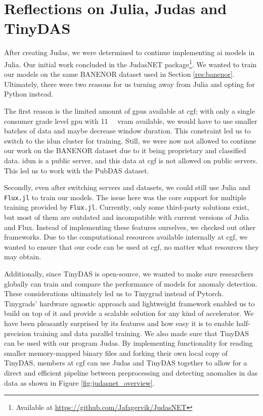 \section*{Reflections on Julia, Judas and TinyDAS}
\label{sec:juliaref}
After creating Judas, we were determined to continue implementing \acrshort{ai} models in Julia. Our initial work concluded in the JudasNET package\footnote{Available at \url{https://github.com/Jafagervik/JudasNET}}. We wanted to train our models on the same BANENOR dataset used in Section \ref{res:banenor}. Ultimately, there were two reasons for us turning away from Julia and opting for Python instead. 

The first reason is the limited amount of \acrshort{gpu}s available at \acrshort{cgf}; with only a single consumer grade level \acrshort{gpu} with \qty{11}{\si{\giga\byte}} \acrshort{vram} available, we would have to use smaller batches of data and maybe decrease window duration. This constraint led us to switch to the \gls{idun} cluster for training. Still, we were now not allowed to continue our work on the BANENOR dataset due to it being proprietary and classified data. \gls{idun} is a public server, and this data at \acrshort{cgf} is not allowed on public servers. This led us to work with the PubDAS \cite{spica2022pubdas, spica2023pubdas} dataset. 

Secondly, even after switching servers and datasets, we could still use Julia and \texttt{Flux.jl} to train our models. The issue here was the core support for multiple training provided by \texttt{Flux.jl}. Currently, only some third-party solutions exist, but most of them are outdated and incompatible with current versions of Julia and Flux. Instead of implementing these features ourselves, we checked out other frameworks. Due to the computational resources available internally at \acrshort{cgf}, we wanted to ensure that our code can be used at \acrshort{cgf}, no matter what resources they may obtain.

Additionally, since TinyDAS is open-source, we wanted to make sure researchers globally can train and compare the performance of models for anomaly detection. These considerations ultimately led us to Tinygrad instead of Pytorch. Tinygrads' hardware agnostic approach and lightweight framework enabled us to build on top of it and provide a scalable solution for any kind of accelerator. We have been pleasantly surprised by its features and how easy it is to enable half-precision training and data parallel training. We also made sure that TinyDAS can be used with our program Judas. By implementing functionality for reading smaller memory-mapped binary files and forking their own local copy of TinyDAS, members at \acrshort{cgf} can use Judas and TinyDAS together to allow for a direct and efficient pipeline between preprocessing and detecting anomalies in \acrshort{das} data as shown in Figure \ref{fig:judasnet_overview}. 

